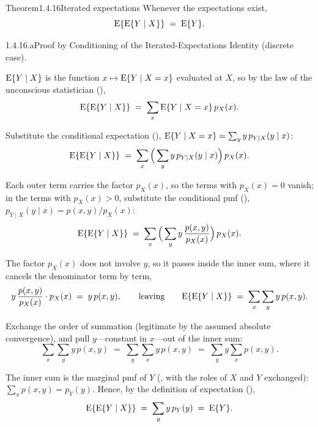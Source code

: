 \documentclass[main.tex]{subfiles}
\begin{document}
\begin{Obj}{Theorem}{1.4.16}{Iterated expectations}
Whenever the expectations exist,
\[ \mathrm{E}\{\mathrm{E}\{Y\mid X\}\} \;=\; \mathrm{E}\{Y\}. \]
\end{Obj}
\begin{Prf}{1.4.16.a}{Proof by Conditioning of the Iterated-Expectations Identity (discrete case).}{}
\item $\mathrm{E}\{Y\mid X\}$ is the function $x\mapsto\mathrm{E}\{Y\mid X=x\}$ evaluated at $X$, so by the law
      of the unconscious statistician (),
      \[ \mathrm{E}\{\mathrm{E}\{Y\mid X\}\} \;=\; \sum_x \mathrm{E}\{Y\mid X=x\}\,p_X(x) . \]
\item Substitute the conditional expectation (),
      $\mathrm{E}\{Y\mid X=x\}=\sum_y y\,p_{Y\mid X}(y\mid x)$:
      \[ \mathrm{E}\{\mathrm{E}\{Y\mid X\}\}
         \;=\; \sum_x\Big(\sum_y y\,p_{Y\mid X}(y\mid x)\Big)\,p_X(x) . \]
\item Each outer term carries the factor $p_X(x)$, so the terms with $p_X(x)=0$ vanish; in the
      terms with $p_X(x)>0$, substitute the conditional pmf (),
      $p_{Y\mid X}(y\mid x)=p(x,y)/p_X(x)$:
      \[ \mathrm{E}\{\mathrm{E}\{Y\mid X\}\}
         \;=\; \sum_x\Big(\sum_y y\,\frac{p(x,y)}{p_X(x)}\Big)\,p_X(x) . \]
\item The factor $p_X(x)$ does not involve $y$, so it passes inside the inner sum, where it
      cancels the denominator term by term,
      \[ y\,\frac{p(x,y)}{p_X(x)}\cdot p_X(x) \;=\; y\,p(x,y) ,
         \qquad\text{leaving}\qquad
         \mathrm{E}\{\mathrm{E}\{Y\mid X\}\} \;=\; \sum_x\sum_y y\,p(x,y) . \]
\item Exchange the order of summation (legitimate by the assumed absolute convergence), and
      pull $y$---constant in $x$---out of the inner sum:
      \[ \sum_x\sum_y y\,p(x,y) \;=\; \sum_y\sum_x y\,p(x,y) \;=\; \sum_y y\sum_x p(x,y) . \]
\item The inner sum is the marginal pmf of $Y$ (, with the roles of $X$ and $Y$
      exchanged): $\sum_x p(x,y)=p_Y(y)$. Hence, by the definition of expectation
      (),
      \[ \mathrm{E}\{\mathrm{E}\{Y\mid X\}\} \;=\; \sum_y y\,p_Y(y) \;=\; \mathrm{E}\{Y\} . \]
\end{Prf}
\end{document}
